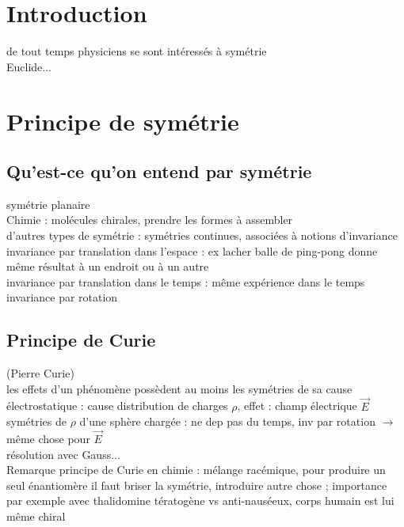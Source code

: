 


\biblio{}

\section*{Introduction}
de tout temps physiciens se sont intéressés à symétrie \\
Euclide...

\section{Principe de symétrie}
\subsection{Qu'est-ce qu'on entend par symétrie}
symétrie planaire \\
Chimie : molécules chirales, prendre les formes à assembler \\
d'autres types de symétrie : symétries continues, associées à notions d'invariance \\
invariance par translation dans l'espace : ex lacher balle de ping-pong donne même résultat à un endroit ou à un autre \\
invariance par translation dans le temps : même expérience dans le temps \\

invariance par rotation \\

\subsection{Principe de Curie}
(Pierre Curie) \\
les effets d'un phénomène possèdent au moins les symétries de sa cause \\
électrostatique : cause distribution de charges $\rho$, effet : champ électrique $\vec{E}$ \\
symétries de $\rho$ d'une sphère chargée : ne dep pas du temps, inv par rotation $\rightarrow$ même chose pour $\vec{E}$ \\
résolution avec Gauss... \\
Remarque principe de Curie en chimie : mélange racémique, pour produire un seul énantiomère il faut briser la symétrie, introduire autre chose ; importance par exemple avec thalidomine tératogène vs anti-nauséeux, corps humain est lui même chiral \\


